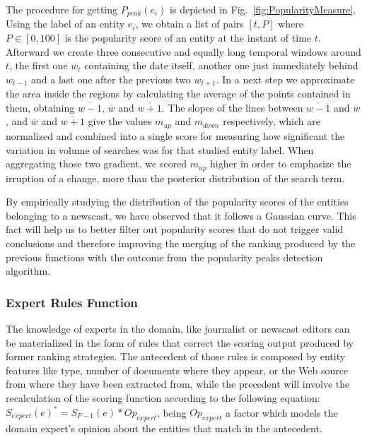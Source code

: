 \documentclass{llncs}
\newcommand{\todo}[1]{\colorbox{red}{#1}}
\begin{document}
The procedure for getting $P_{peak}(e_i)$ is depicted in Fig.~\ref{fig:PopularityMeasure}. Using the label of an entity $e_i$, we obtain a list of pairs $[t, P]$ where $P\in[0,100]$ is the popularity score of an entity at the instant of time $t$. Afterward we create three consecutive and equally long temporal windows around $t$, the first one $w_{t}$ containing the date itself, another one just immediately behind $w_{t-1}$ and a last one after the previous two $w_{t+1}$. 
In a next step we approximate the area inside the regions by calculating the average of the points contained in them, obtaining $\overline{w-1}$, $\overline{w}$ and $\overline{w+1}$. The slopes of the lines between $\overline{w-1}$ and $\overline{w}$, and $\overline{w}$ and $\overline{w+1}$ give the values $m_{up}$ and $m_{down}$ respectively, which are normalized and combined into a single score for measuring how significant the variation in volume of searches was for that studied entity label. When aggregating those two gradient, we scored $m_{up}$ higher in order to emphasize the irruption of a change, more than the posterior distribution of the search term.

By empirically studying the distribution of the popularity scores of the entities belonging to a newscast, we have observed that it follows a Gaussian curve. This fact will help us to better filter out popularity scores that do not trigger valid conclusions and therefore improving the merging of the ranking produced by the previous functions with the outcome from the popularity peaks detection algorithm. 

\subsubsection{Expert Rules Function}
The knowledge of experts in the domain, like journalist or newscast editors can be materialized in the form of rules that correct the scoring output produced by former ranking strategies. The antecedent of those rules is composed by entity features like type, number of documents where they appear, or the Web source from where they have been extracted from, while the precedent will involve the recalculation of the scoring function according to the following equation: $S_{expert}\left ( e \right )^{*} =  S_{F-1}\left ( e \right ) *Op _{expert}$, being $Op _{expert}$ a factor which models the domain expert's opinion about the entities that match in the antecedent.
\end{document}
